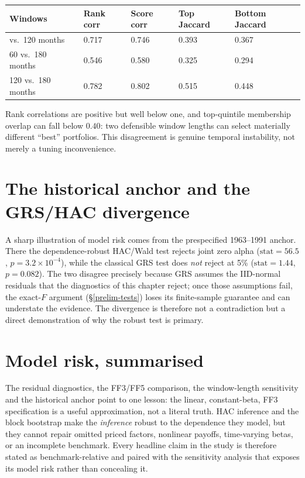 \begin{longtable}[]{@{}p{}p{}p{}p{}p{}@{}}
\toprule\noalign{}
Windows & Rank corr & Score corr & Top Jaccard & Bottom Jaccard \\
\midrule\noalign{}
\endhead
\bottomrule\noalign{}
\endlastfoot
60 vs.\ 120 months & 0.717 & 0.746 & 0.393 & 0.367 \\
60 vs.\ 180 months & 0.546 & 0.580 & 0.325 & 0.294 \\
120 vs.\ 180 months & 0.782 & 0.802 & 0.515 & 0.448 \\
\end{longtable}

Rank correlations are positive but well below one, and top-quintile
membership overlap can fall below $0.40$: two defensible window lengths can
select materially different ``best'' portfolios. This disagreement is
genuine temporal instability, not merely a tuning inconvenience.

\hypertarget{historical-anchor}{%
\section{The historical anchor and the GRS/HAC divergence}\label{historical-anchor}}

A sharp illustration of model risk comes from the prespecified
1963--1991 anchor. There the dependence-robust HAC/Wald test rejects joint
zero alpha ($\mathrm{stat}=56.5$, $p=3.2\times10^{-4}$), while the classical
GRS test does \emph{not} reject at 5\% ($\mathrm{stat}=1.44$, $p=0.082$).
The two disagree precisely because GRS assumes the IID-normal residuals that
the diagnostics of this chapter reject; once those assumptions fail, the
exact-$F$ argument (\S\ref{prelim-tests}) loses its finite-sample guarantee
and can understate the evidence. The divergence is therefore not a
contradiction but a direct demonstration of why the robust test is primary.

\hypertarget{model-risk-summary}{%
\section{Model risk, summarised}\label{model-risk-summary}}

The residual diagnostics, the FF3/FF5 comparison, the window-length
sensitivity and the historical anchor point to one lesson: the linear,
constant-beta, FF3 specification is a useful approximation, not a literal
truth. HAC inference and the block bootstrap make the \emph{inference}
robust to the dependence they model, but they cannot repair omitted priced
factors, nonlinear payoffs, time-varying betas, or an incomplete benchmark.
Every headline claim in the study is therefore stated as
benchmark-relative and paired with the sensitivity analysis that exposes
its model risk rather than concealing it.

